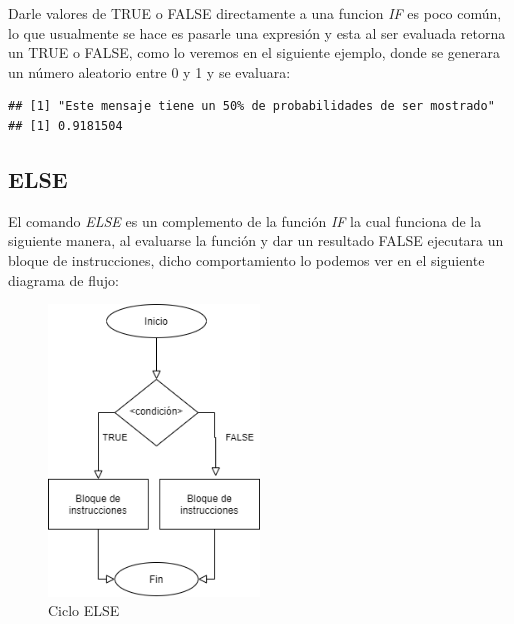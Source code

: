\documentclass[11pt,]{article}
\newenvironment{Shaded}{\begin{snugshade}}{\end{snugshade}}
\newcommand{\ControlFlowTok}[1]{\textcolor[rgb]{0.13,0.29,0.53}{\textbf{#1}}}
\newcommand{\DecValTok}[1]{\textcolor[rgb]{0.00,0.00,0.81}{#1}}
\newcommand{\FloatTok}[1]{\textcolor[rgb]{0.00,0.00,0.81}{#1}}
\newcommand{\KeywordTok}[1]{\textcolor[rgb]{0.13,0.29,0.53}{\textbf{#1}}}
\newcommand{\NormalTok}[1]{#1}
\newcommand{\OperatorTok}[1]{\textcolor[rgb]{0.81,0.36,0.00}{\textbf{#1}}}
\newcommand{\StringTok}[1]{\textcolor[rgb]{0.31,0.60,0.02}{#1}}
\begin{document}
Darle valores de TRUE o FALSE directamente a una funcion \emph{IF} es
poco común, lo que usualmente se hace es pasarle una expresión y esta al
ser evaluada retorna un TRUE o FALSE, como lo veremos en el siguiente
ejemplo, donde se generara un número aleatorio entre 0 y 1 y se
evaluara:

\begin{Shaded}
\end{Shaded}

\begin{verbatim}
## [1] "Este mensaje tiene un 50% de probabilidades de ser mostrado"
## [1] 0.9181504
\end{verbatim}

\hypertarget{else}{%
\subsection{ELSE}\label{else}}

El comando \emph{ELSE} es un complemento de la función \emph{IF} la cual
funciona de la siguiente manera, al evaluarse la función y dar un
resultado FALSE ejecutara un bloque de instrucciones, dicho
comportamiento lo podemos ver en el siguiente diagrama de flujo:

\begin{figure}
\hypertarget{id}{%
\centering
\includegraphics[width=0.5\textwidth,height=0.3\textheight]{../schemas/ELSE.png}
\caption{Ciclo ELSE}\label{id}
}
\end{figure}
\end{document}
